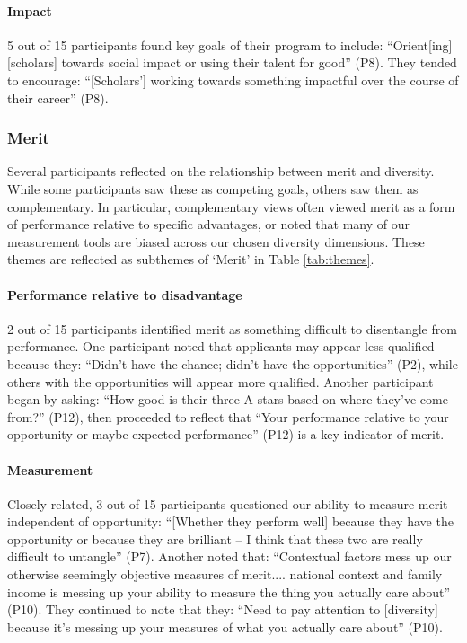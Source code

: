 \paragraph{Impact}
5 out of 15 participants found key goals of their program to include: ``Orient[ing] [scholars] towards social impact or using their talent for good'' (P8). They tended to encourage: ``[Scholars'] working towards something impactful over the course of their career'' (P8).

\subsubsection{Merit}
Several participants reflected on the relationship between merit and diversity. While some participants saw these as competing goals, others saw them as complementary. In particular, complementary views often viewed merit as a form of performance relative to specific advantages, or noted that many of our measurement tools are biased across our chosen diversity dimensions. These themes are reflected as subthemes of `Merit' in Table \ref{tab:themes}.

\paragraph{Performance relative to disadvantage}
2 out of 15 participants identified merit as something difficult to disentangle from performance. One participant noted that applicants may appear less qualified because they: ``Didn't have the chance; didn't have the opportunities'' (P2), while others with the opportunities will appear more qualified. Another participant began by asking: ``How good is their three A stars based on where they've come from?'' (P12), then proceeded to reflect that ``Your performance relative to your opportunity or maybe expected performance'' (P12) is a key indicator of merit.

\paragraph{Measurement}
Closely related, 3 out of 15 participants questioned our ability to measure merit independent of opportunity: ``[Whether they perform well] because they have the opportunity or because they are brilliant – I think that these two are really difficult to untangle'' (P7). Another noted that: ``Contextual factors mess up our otherwise seemingly objective measures of merit.... national context and family income is messing up your ability to measure the thing you actually care about'' (P10). They continued to note that they: ``Need to pay attention to [diversity] because it's messing up your measures of what you actually care about'' (P10).

